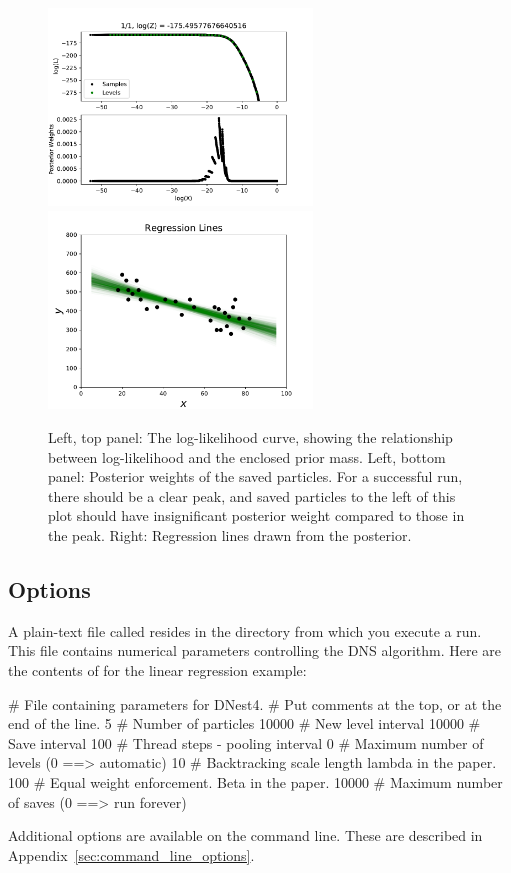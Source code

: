 \documentclass[article]{jss}
\begin{document}
\begin{figure}[t!]
  \centering
\includegraphics[width=7cm]{fig3.pdf}
\includegraphics[width=7cm]{regression_lines.pdf}
\caption{Left, top panel: The log-likelihood curve, showing the relationship
between log-likelihood and the enclosed prior mass.
Left, bottom panel: Posterior weights of the saved particles.
For a successful run, there should be a clear peak, and saved particles
to the left of this plot should have insignificant posterior weight compared
to those in the peak.
Right: Regression lines drawn from the posterior.
\label{fig:fig3}}
\end{figure}

\subsection{Options}\label{sec:options}
A plain-text file called  resides in the directory from which you
execute a run. This file contains numerical parameters controlling the
DNS algorithm. Here are the contents of  for the linear
regression example:
%
\begin{CodeChunk}
\begin{CodeInput}
# File containing parameters for DNest4.
# Put comments at the top, or at the end of the line.
5       # Number of particles
10000   # New level interval
10000   # Save interval
100     # Thread steps - pooling interval
0       # Maximum number of levels (0 ==> automatic)
10      # Backtracking scale length lambda in the paper.
100     # Equal weight enforcement. Beta in the paper.
10000   # Maximum number of saves (0 ==> run forever)
\end{CodeInput}
\end{CodeChunk}
%
Additional options are available on the command line. These are
described in Appendix~\ref{sec:command_line_options}.
\end{document}
